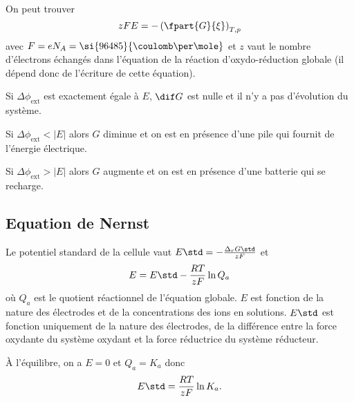On peut trouver
\[ zFE = -\left(\fpart{G}{\xi }\right)_{T,p} \]
avec $F = eN_A = \si{96485}{\coulomb\per\mole}$
et $z$ vaut le nombre d'électrons échangés dans l'équation de la réaction
d'oxydo-réduction globale (il dépend donc de l'écriture de cette équation).

Si $\Delta \phi_\mathrm{ext}$ est exactement égale à $E$,
$\dif G$ est nulle et
il n'y a pas d'évolution du système.

Si $\Delta \phi_\mathrm{ext} < |E|$
alors $G$ diminue et on est en présence d'une pile
qui fournit de l'énergie électrique.

Si $\Delta \phi_\mathrm{ext} > |E|$
alors $G$ augmente et
on est en présence d'une batterie
qui se recharge.

\subsection{Equation de Nernst}
Le potentiel standard de la cellule vaut
$E\std = -\frac{\Delta_rG\std}{zF}$ et
\[ E = E\std-\frac{RT}{zF}\ln Q_a \]
où $Q_a$ est le quotient réactionnel de l'équation globale.
$E$ est fonction de la nature des électrodes et
de la concentrations des ions en solutions.
$E\std$ est fonction uniquement de la nature des électrodes,
de la différence entre la force oxydante du système oxydant et
la force réductrice du système réducteur.

À l'équilibre, on a $E = 0$ et $Q_a = K_a$ donc
\[ E\std = \frac{RT}{zF}\ln K_a. \]

